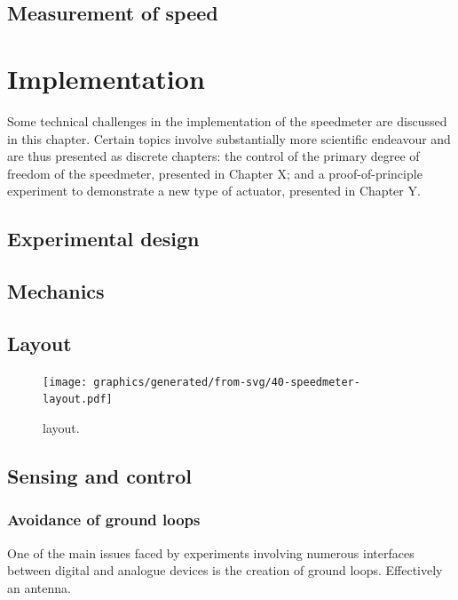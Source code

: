\subsection{Measurement of speed}


\section{Implementation}

Some technical challenges in the implementation of the speedmeter are discussed in this chapter. Certain topics involve substantially more scientific endeavour and are thus presented as discrete chapters: the control of the primary degree of freedom of the speedmeter, presented in Chapter X; and a proof-of-principle experiment to demonstrate a new type of actuator, presented in Chapter Y.

\subsection{Experimental design}

\subsection{Mechanics}

\subsection{Layout}

\begin{figure}
  \centering
  \texttt{[image: graphics/generated/from-svg/40-speedmeter-layout.pdf]}
  \caption{\label{fig:ssm-layout}\SSMEXPT{} layout.}
\end{figure}

\subsection{Sensing and control}

\subsubsection{Avoidance of ground loops}

One of the main issues faced by experiments involving numerous interfaces between digital and analogue devices is the creation of ground loops. Effectively an antenna.

